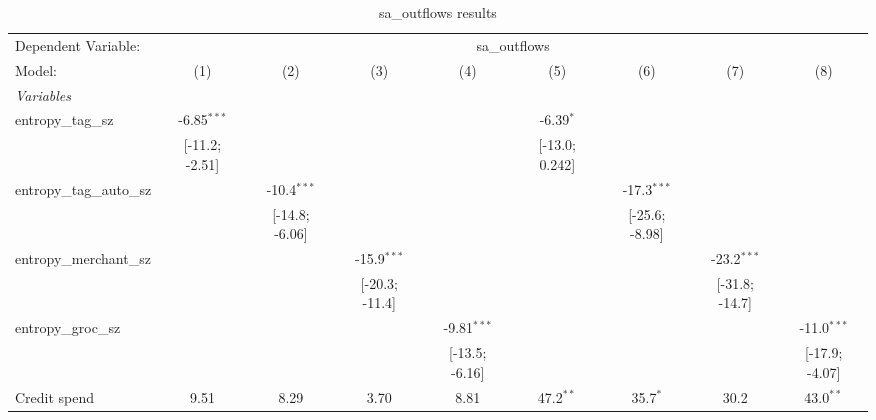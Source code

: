 
\begin{table}[htbp]
   \centering
   \tiny
   \begin{threeparttable}[b]
      \caption{sa\_outflows results}
      \begin{tabular}{lcccccccc}
         \tabularnewline \midrule \midrule
         Dependent Variable: & \multicolumn{8}{c}{sa\_outflows}\\
         Model:                    & (1)            & (2)            & (3)             & (4)            & (5)             & (6)             & (7)             & (8)\\  
         \midrule
         \emph{Variables}\\
         entropy\_tag\_sz          & -6.85$^{***}$  &                &                 &                & -6.39$^{*}$     &                 &                 &   \\   
                                   & [-11.2; -2.51] &                &                 &                & [-13.0; 0.242]  &                 &                 &   \\   
         entropy\_tag\_auto\_sz    &                & -10.4$^{***}$  &                 &                &                 & -17.3$^{***}$   &                 &   \\   
                                   &                & [-14.8; -6.06] &                 &                &                 & [-25.6; -8.98]  &                 &   \\   
         entropy\_merchant\_sz     &                &                & -15.9$^{***}$   &                &                 &                 & -23.2$^{***}$   &   \\   
                                   &                &                & [-20.3; -11.4]  &                &                 &                 & [-31.8; -14.7]  &   \\   
         entropy\_groc\_sz         &                &                &                 & -9.81$^{***}$  &                 &                 &                 & -11.0$^{***}$\\   
                                   &                &                &                 & [-13.5; -6.16] &                 &                 &                 & [-17.9; -4.07]\\   
         Credit spend              & 9.51           & 8.29           & 3.70            & 8.81           & 47.2$^{**}$     & 35.7$^{*}$      & 30.2            & 43.0$^{**}$\\   

\end{tabular}
\end{threeparttable}
\end{table}

